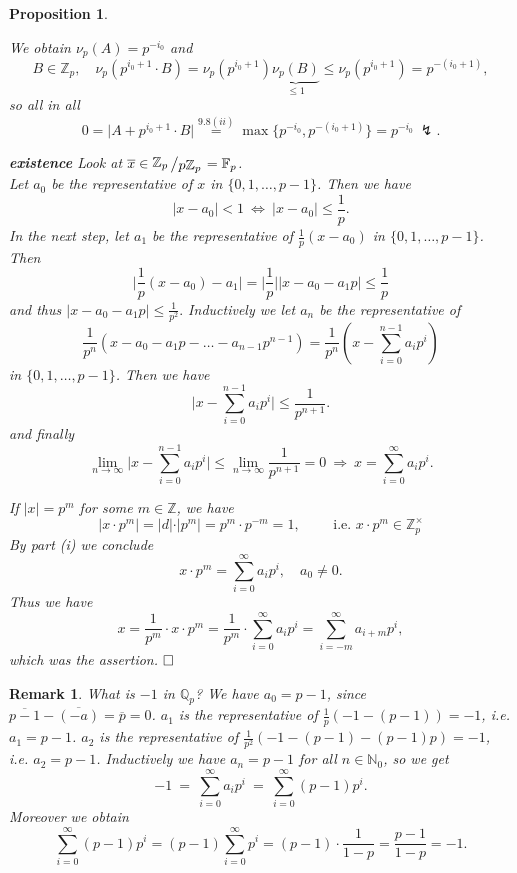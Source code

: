 \documentclass[11pt]{book}
\newtheorem{proposition}[theorem]{Proposition}
\newtheorem{remark}[theorem]{Remark}
\theoremstyle{nonumberbreak}
\newenvironment{pr}[1][]{\ifthenelse{\equal{#1}{}}{\proof}{\proof[#1]}\rm}{\endproof}
\newcommand{\slant}[2]{{\raisebox{.1em}{$#1$}\left/\raisebox{-.1em}{$#2$}\right.}}
\begin{document}
\begin{spacing}{1.3}
\begin{proposition}
\begin{pr}
\begin{compactenum}
\begin{compactenum}
We obtain
$\nu_p(A)=p^{-i_0}$
and
$$ B \in \mathbb{Z}_p, \quad \nu_p\left(p^{i_0+1} \cdot B\right) = \nu_p\left(p^{i_0+1}\right) \underbrace{\nu_p(B)}_{\leqslant 1} \leqslant \nu_p\left(p^{i_0+1}\right)=p^{-(i_0+1)},$$
so all in all
$$0=\big\vert A+ p^{i_0+1} \cdot B \big\vert \overset{9.8(ii)}{=} \max\{p^{-i_0}, p^{-(i_0+1)}\} = p^{-i_0} \ \lightning. $$
\item[\textbf{existence}] Look at $\overline{x} \in \slant{\mathbb{Z}_p}{p \mathbb{Z}_p} = \mathbb{F}_p$.\\
Let $a_0$ be the representative of $x$ in $\{0,1, \ldots, p-1\}$. Then we have
$$|x-a_0| < 1 \ \Leftrightarrow \ |x-a_0| \leqslant \frac{1}{p}.$$
In the next step, let $a_1$ be the representative of $\frac{1}{p}(x-a_0)$ in $\{0,1, \ldots, p-1\}$. Then 
$$\bigg\vert \frac{1}{p} (x-a_0) - a_1 \bigg\vert = \bigg\vert \frac{1}{p} \bigg\vert \vert x-a_0-a_1p \vert \leqslant \frac{1}{p}$$
and thus
$\vert x-a_0-a_1 p \vert \leqslant \frac{1}{p^2}.$
Inductively we let $a_n$ be the representative of $$\frac{1}{p^n}(x-a_0-a_1p- \ldots -a_{n-1}p^{n-1} )=\frac{1}{p^n} \left(x- \sum_{i=0}^{n-1} a_i p^{i} \right)$$
in $\{0,1, \ldots, p-1\}$. Then we have
$$\bigg\vert x- \sum_{i=0}^{n-1} a_i p^{i} \bigg\vert \leqslant \frac{1}{p^{n+1}}.$$
and finally
$$\lim_{n \to \infty} \bigg\vert x- \sum_{i=0}^{n-1} a_i p^{i} \bigg\vert \leqslant \lim_{n \to \infty} \frac{1}{p^{n+1}} =0 \ \Longrightarrow \ x = \sum_{i=0}^{\infty} a_i p^{i}.$$
\end{compactenum}
\item  If $|x|=p^m$ for some $m \in \mathbb{Z}$, we have $$\vert x \cdot p^m\vert = \vert d \vert \cdot \vert p^m \vert = p^m \cdot p^{-m}=1, \qquad \textrm{ i.e. }x \cdot p^m\in \mathbb{Z}_p^{\times}$$
By part (i) we conclude $$x \cdot p^m= \sum_{i=0}^{\infty} a_i p^{i}, \quad a_0 \neq 0.$$
Thus we have
$$x= \frac{1}{p^m} \cdot x \cdot p^m = \frac{1}{p^m} \cdot \sum_{i=0}^{\infty} a_i p^{i} = \sum_{i=-m}^{\infty} a_{i+m}p^{i},$$
which was the assertion. $\hfill \Box$
\end{compactenum}
\end{pr}
\end{proposition}

\begin{remark}%
What is $-1$ in $\mathbb{Q}_p$? We have
$a_0=p-1$, since $\overline{p-1}-\overline{(-a)}=\overline{p}=0$.
$a_1$ is the representative of $\frac{1}{p}\left(-1-(p-1)\right)=-1$, i.e. $a_1=p-1$.
$a_2$ is the representative of $\frac{1}{p^2}\left(-1-(p-1)-(p-1)p\right)=-1$, i.e. $a_2=p-1$.
Inductively we have $a_n=p-1$ for all $n \in \mathbb{N}_0$, so we get
$$-1\ =\ \sum_{i=0}^{\infty} a_i p^{i}\ =\ \sum_{i=0}^{\infty} (p-1)p^{i}.$$
Moreover we obtain
$$\sum_{i=0}^{\infty} (p-1)p^{i}=(p-1) \sum_{i=0}^{\infty} p^{i} = (p-1) \cdot \frac{1}{1-p} = \frac{p-1}{1-p}=-1.$$
\end{remark}


\end{spacing}
\end{document}
